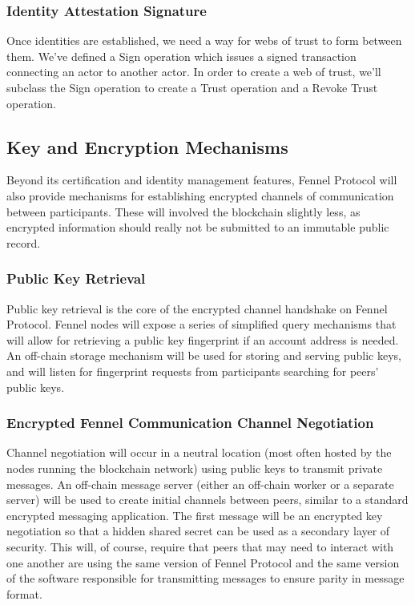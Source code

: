 \documentclass[]{article}
\begin{document}
\subsubsection{Identity Attestation Signature}
\label{scrivauto:48}

Once identities are established, we need a way for webs of trust to form between them. We've defined a Sign operation which issues a signed transaction connecting an actor to another actor. In order to create a web of trust, we'll subclass the Sign operation to create a Trust operation and a Revoke Trust operation.

\subsection{Key and Encryption Mechanisms}
\label{scrivauto:49}

Beyond its certification and identity management features, Fennel Protocol will also provide mechanisms for establishing encrypted channels of communication between participants. These will involved the blockchain slightly less, as encrypted information should really not be submitted to an immutable public record.

\subsubsection{Public Key Retrieval}
\label{scrivauto:50}

Public key retrieval is the core of the encrypted channel handshake on Fennel Protocol. Fennel nodes will expose a series of simplified query mechanisms that will allow for retrieving a public key fingerprint if an account address is needed. An off-chain storage mechanism will be used for storing and serving public keys, and will listen for fingerprint requests from participants searching for peers' public keys.

\subsubsection{Encrypted Fennel Communication Channel Negotiation}
\label{scrivauto:51}

Channel negotiation will occur in a neutral location (most often hosted by the nodes running the blockchain network) using public keys to transmit private messages. An off-chain message server (either an off-chain worker or a separate server) will be used to create initial channels between peers, similar to a standard encrypted messaging application. The first message will be an encrypted key negotiation so that a hidden shared secret can be used as a secondary layer of security.
This will, of course, require that peers that may need to interact with one another are using the same version of Fennel Protocol and the same version of the software responsible for transmitting messages to ensure parity in message format.
\end{document}
